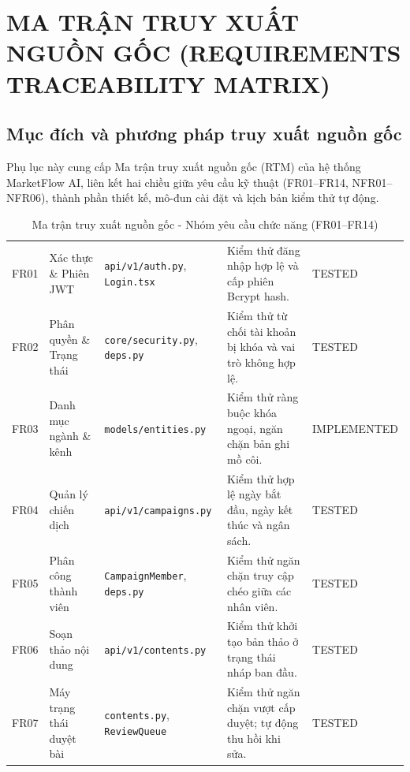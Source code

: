 \appendix
\renewcommand{\chaptername}{Phụ lục}
\chapter{MA TRẬN TRUY XUẤT NGUỒN GỐC (REQUIREMENTS TRACEABILITY MATRIX)}

\section{Mục đích và phương pháp truy xuất nguồn gốc}

Phụ lục này cung cấp Ma trận truy xuất nguồn gốc (RTM) của hệ thống MarketFlow AI, liên kết hai chiều giữa yêu cầu kỹ thuật (FR01--FR14, NFR01--NFR06), thành phần thiết kế, mô-đun cài đặt và kịch bản kiểm thử tự động.

\begin{table}[H]
\centering
\scriptsize
\renewcommand{\arraystretch}{0.96}
\caption{Ma trận truy xuất nguồn gốc - Nhóm yêu cầu chức năng (FR01--FR14)}\label{tab:v9-traceability-fr}
\begin{tabularx}{\textwidth}{|C{0.9cm}|L{2.5cm}|L{3.3cm}|Y|C{2.1cm}|}
\hline
{} &  &  &  & \\
\hline
FR01 & Xác thực \& Phiên JWT & \texttt{api/v1/auth.py}, \texttt{Login.tsx} & Kiểm thử đăng nhập hợp lệ và cấp phiên Bcrypt hash. & TESTED\\
\hline
FR02 & Phân quyền \& Trạng thái & \texttt{core/security.py}, \texttt{deps.py} & Kiểm thử từ chối tài khoản bị khóa và vai trò không hợp lệ. & TESTED\\
\hline
FR03 & Danh mục ngành \& kênh & \texttt{models/entities.py} & Kiểm thử ràng buộc khóa ngoại, ngăn chặn bản ghi mồ côi. & IMPLEMENTED\\
\hline
FR04 & Quản lý chiến dịch & \texttt{api/v1/campaigns.py} & Kiểm thử hợp lệ ngày bắt đầu, ngày kết thúc và ngân sách. & TESTED\\
\hline
FR05 & Phân công thành viên & \texttt{CampaignMember}, \texttt{deps.py} & Kiểm thử ngăn chặn truy cập chéo giữa các nhân viên. & TESTED\\
\hline
FR06 & Soạn thảo nội dung & \texttt{api/v1/contents.py} & Kiểm thử khởi tạo bản thảo ở trạng thái nháp ban đầu. & TESTED\\
\hline
FR07 & Máy trạng thái duyệt bài & \texttt{contents.py}, \texttt{ReviewQueue} & Kiểm thử ngăn chặn vượt cấp duyệt; tự động thu hồi khi sửa. & TESTED\\

\end{tabularx}
\end{table}
